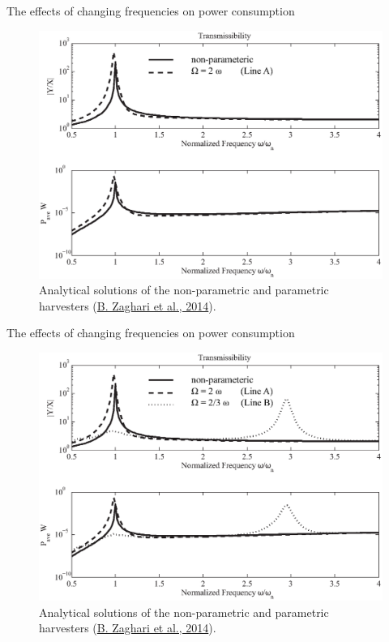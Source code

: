 \documentclass[LaTeX2e,10pt]{beamer}
\begin{document}
\begin{frame}{The effects of changing frequencies on power consumption}
\begin{figure}
\includegraphics[width=\linewidth]{Images/Fig9EuroDyn2.eps}
\caption{Analytical solutions of the non-parametric and parametric harvesters (\href{https://eprints.soton.ac.uk/366807/}{B. Zaghari et al., 2014}).} 
\end{figure}
\end{frame}
\begin{frame}{The effects of changing frequencies on power consumption}
\begin{figure}
\includegraphics[width=\linewidth]{Images/Fig9EuroDyn3.eps}
\caption{Analytical solutions of the non-parametric and parametric harvesters (\href{https://eprints.soton.ac.uk/366807/}{B. Zaghari et al., 2014}).} 
\end{figure}
\end{frame}
\end{document}
